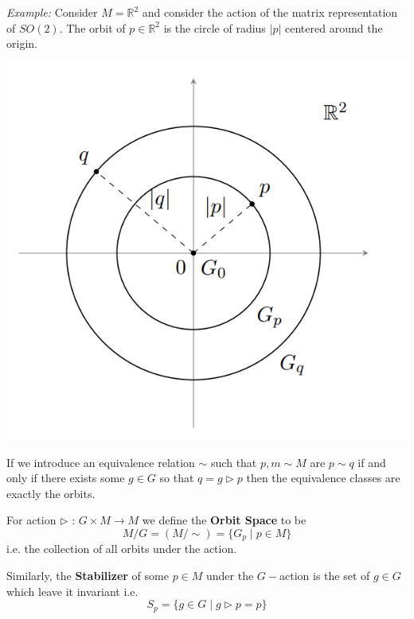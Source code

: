 \documentclass[11pt]{article}
\begin{document}
\textit{Example:} Consider $M = \mathbb{R}^2$ and consider the action of the matrix representation of $SO(2)$. The orbit of $p \in \mathbb{R}^2$ is the circle of radius $|p|$ centered around the origin.
\begin{center}
    \includegraphics*[scale=0.30]{pictures/Schuller_orbit_ofSO(2).png} \\
    \cite[Pg. 165]{SchullerGeomAnatomy}
\end{center}

If we introduce an equivalence relation $\sim$ such that $p, m \sim M$ are $p \sim q$ if and only if there exists some $g \in G$ so that $q = g \triangleright p$ then the equivalence classes are exactly the orbits. 

\begin{definition}
    For action $\triangleright \text{ : } G \times M \rightarrow M$ we define the \textbf{Orbit Space} to be 
    \[ M/G = \left(M/\sim\right) = \{ G_p \; | \; p \in M \} \]
    i.e. the collection of all orbits under the action.
\end{definition}

\begin{definition}
    Similarly, the \textbf{Stabilizer} of some $p \in M$ under the $G-$action is the set of $g \in G$ which leave it invariant i.e. \[ S_p = \{ g \in G\; | \; g \triangleright p = p \}  \]
\end{definition}
\end{document}
